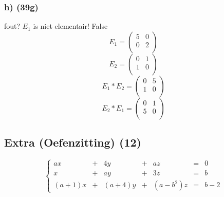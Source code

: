 \documentclass[lineaire_algebra_oplossingen.tex]{subfiles}
\begin{document}
\subsubsection*{h) (39g)}
fout? $E_1$ is niet elementair!
False
\[
E_1=\left( \begin{array}{cc}
    5 & 0\\
    0 & 2\\
\end{array}\right)
\]
\[
E_2=\left( \begin{array}{cc}
    0 & 1\\
    1 & 0\\
\end{array}\right)
\]
\[
E_1*E_2=\left( \begin{array}{cc}
    0 & 5\\
    1 & 0\\
\end{array}\right)
\]
\[
E_2*E_1=\left( \begin{array}{cc}
    0 & 1\\
    5 & 0\\
\end{array}\right)
\]

\subsection{Extra (Oefenzitting) (12)}
\[
\left\{
\begin{array}{ccccccc}
ax &+& 4y &+& az &=& 0\\
x  &+& ay &+& 3z &=& b\\
(a+1)x &+& (a+4)y &+& (a-b^{2})z &=& b-2
\end{array}
\right.
\]
\end{document}
